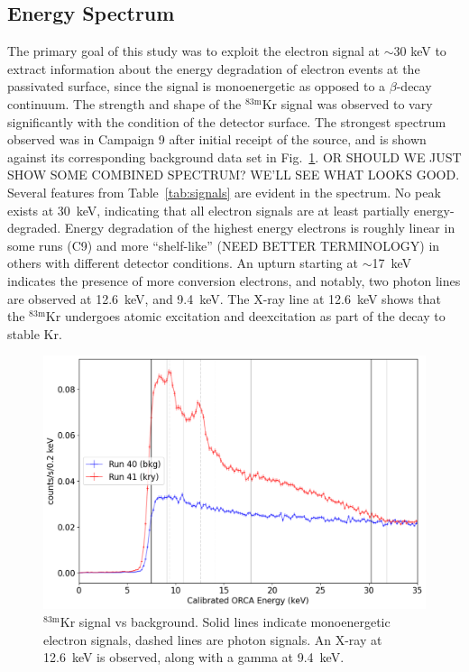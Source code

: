 \documentclass[nofootinbib,superscriptaddress, aps, prc, 
10pt, amsmath, amssymb, bibnotes,
altaffilletter, twocolumn, floatfix]{revtex4-2}
\def\kr83{{${}^{83\mathrm{m}}$Kr}}
\begin{document}
\subsection{Energy Spectrum}

    The primary goal of this study was to exploit the electron signal at $\sim$30 keV to extract information about the energy degradation of electron events at the passivated surface, since the signal is monoenergetic as opposed to a $\beta$-decay continuum.
    The strength and shape of the \kr83 signal was observed to vary significantly with the condition of the detector surface.
    The strongest spectrum observed was in Campaign 9 after initial receipt of the source, and is shown against its corresponding background data set in Fig.~\ref{fig:spectrum}. OR SHOULD WE JUST SHOW SOME COMBINED SPECTRUM? WE'LL SEE WHAT LOOKS GOOD. 
    Several features from Table~\ref{tab:signals} are evident in the spectrum.
    No peak exists at 30~keV, indicating that all electron signals are at least partially energy-degraded. Energy degradation of the highest energy electrons is roughly linear in some runs (C9) and more ``shelf-like'' (NEED BETTER TERMINOLOGY) in others with different detector conditions. 
    An upturn starting at $\sim$17~keV indicates the presence of more conversion electrons, and notably, two photon lines are observed at 12.6~keV, and 9.4~keV.
    The X-ray line at 12.6~keV shows that the \kr83 undergoes atomic excitation and deexcitation as part of the decay to stable Kr.

    \begin{figure}
        \includegraphics[width=\columnwidth]{krstc_spectrum.png}
        \caption{\kr83 signal vs background.  Solid lines indicate monoenergetic electron signals, dashed lines are photon signals.  An X-ray at 12.6~keV is observed, along with a gamma at 9.4~keV.}
        \label{fig:spectrum}
    \end{figure}
    
\end{document}
